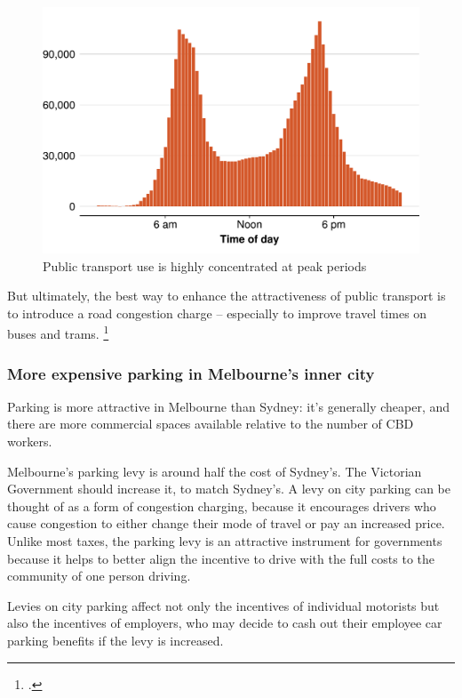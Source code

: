 \documentclass{grattan}
\begin{document}
\begin{figure}
\caption{Public transport use is highly concentrated at peak periods}\label{fig:PTV_loads} %
\includegraphics{atlas/Public-transport-use-1.pdf}
\end{figure}

But ultimately, the best way to enhance the attractiveness of public transport is to introduce a road congestion charge -- especially to improve travel times on buses and trams.%
    \footcite{Urbanist-2011-Do-governments-spend-too-much-on-roads}

\subsubsection{More expensive parking in Melbourne's inner city}
Parking is more attractive in Melbourne than Sydney: it's generally cheaper, and there are more commercial spaces available relative to the number of CBD workers.

Melbourne's parking levy is around half the cost of Sydney's.
The Victorian Government should increase it, to match Sydney's.
A levy on city parking can be thought of as a form of congestion charging, because it encourages drivers who cause congestion to either change their mode of travel or pay an increased price.
Unlike most taxes, the parking levy is an attractive instrument for governments because it helps to better align the incentive to drive with the full costs to the community of one person driving.

Levies on city parking affect not only the incentives of individual motorists but also the incentives of employers, who may decide to cash out their employee car parking benefits if the levy is increased.
\end{document}
